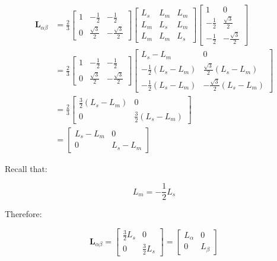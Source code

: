 \documentclass{article}
\begin{document}
\begin{align}
    \mathbf{L}_{\alpha\beta} &= \frac{2}{3}
    \begin{bmatrix}
        1 & -\frac{1}{2} & -\frac{1}{2} \\
        0 & \frac{\sqrt{3}}{2} & -\frac{\sqrt{3}}{2}
    \end{bmatrix}
    \begin{bmatrix}
        L_s & L_m & L_m \\
        L_m & L_s & L_m \\
        L_m & L_m & L_s
    \end{bmatrix}
    \begin{bmatrix}
        1 & 0 \\
        -\frac{1}{2} & \frac{\sqrt{3}}{2} \\
        -\frac{1}{2} & -\frac{\sqrt{3}}{2}
    \end{bmatrix} \\[4pt]
    &= \frac{2}{3}
    \begin{bmatrix}
        1 & -\frac{1}{2} & -\frac{1}{2} \\
        0 & \frac{\sqrt{3}}{2} & -\frac{\sqrt{3}}{2}
    \end{bmatrix}
    \begin{bmatrix}
        L_s-L_m & 0 \\
        -\frac{1}{2}(L_s-L_m) &
        \frac{\sqrt{3}}{2}(L_s-L_m) \\
        -\frac{1}{2}(L_s-L_m) &
        -\frac{\sqrt{3}}{2}(L_s-L_m)
    \end{bmatrix} \\[4pt]
    &= \frac{2}{3}
    \begin{bmatrix}
        \frac{3}{2}(L_s-L_m) & 0 \\
        0 & \frac{3}{2}(L_s-L_m)
    \end{bmatrix} \\[4pt]
    &=
    \begin{bmatrix}
        L_s-L_m & 0 \\
        0 & L_s-L_m
    \end{bmatrix}
\end{align}

Recall that:

\begin{equation}
    L_m = -\frac{1}{2}L_s
\end{equation}

Therefore:

\begin{equation}
    \mathbf{L}_{\alpha\beta} =
    \begin{bmatrix}
        \frac{3}{2}L_s & 0 \\
        0 & \frac{3}{2}L_s
    \end{bmatrix}
    =
    \begin{bmatrix}
        L_{\alpha} & 0 \\
        0 & L_{\beta}
    \end{bmatrix}
\end{equation}
\end{document}

